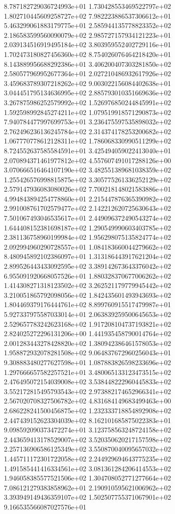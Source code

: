 8.787182729036724993e+01 1.730428553469522797e+02 1.802710445609258727e+02
7.982223886537306612e+01 5.463299061883179775e+01 2.585944135778823352e+02
2.186583599560090079e+02 2.985727157934121223e+01 2.039134516919495184e+02
3.803959552402729116e+01 1.702473180827456360e+02 8.754026076464218420e+01
8.143889956688292386e+01 3.406200407303281850e+02 2.580577969952677364e+01
2.027210486932617926e+02 3.459683789307218262e+02 9.003022156084402638e+01
3.044451795134636995e+02 2.885793010351669636e+02 3.267875986252579992e+02
1.526976850244845991e+02 1.592598992845274211e+02 1.079519918571290873e+02
7.940784477997699753e+01 3.236475597535898032e+02 2.762496236136245784e+02
2.314374178253200682e+02 1.067770778612128311e+02 1.786068330990511299e+02
8.724552637585584591e+01 3.425494059022413040e+01 2.070894371461977812e+02
4.557607491017288126e+00 3.070666516464107190e+02 3.482551389681038359e+02
1.255426576998815875e+02 3.305775261336252129e+02 2.579147936083080026e+02
7.700218148021583886e+01 4.994843894254778860e+01 2.215447876365390982e+02
2.991008761702579477e+02 2.142212620725630643e+02 7.501067493046535617e+01
2.449096372490543274e+02 1.644408152381698187e+02 1.290549990603403785e+02
2.381136758960199984e+02 1.956298075135824774e+02 2.092994960290728557e+01
1.084183660044279662e+02 8.480945892102386097e+01 1.313186443917621204e+02
2.899526443433092595e+02 3.389142673643376042e+02 6.955091920668057526e+01
1.880328370677006262e+02 1.414308271318123502e+02 3.262521179779945442e+02
3.210051865792098056e+02 1.842435601493943693e+02 1.804469379176444761e+02
8.899760915517479987e+01 5.927337975587033014e+01 2.063839259500645653e+02
2.529657783242623168e+02 1.917208104737193821e+02 2.824025272296131206e+00
1.441935458790014764e+02 2.001283443278428820e+02 1.380942386461578053e+02
1.958872932078281508e+02 9.064837672960256043e+01 9.308883480277627598e+01
1.087883826598233696e+02 1.297666657582257521e+01 3.480065133123473515e+02
2.476495072154039008e+02 3.538448222960445833e+02 3.552172815495793543e+02
2.973882174652966341e+02 2.567020708327506782e+02 4.831684149683499463e+00
2.686228241500456875e+02 1.232333718854892908e+02 2.447439152623304039e+02
8.162101685875022383e+01 9.098592090373472274e+01 3.123758563248724158e+02
2.443659413178529007e+02 3.520350620217157598e+02 2.257136906586125349e+02
3.550870040095657032e+02 1.445711172301722058e+02 2.244929694643775235e+02
1.491585441416334561e+02 3.081361284206414553e+02 1.946058385577521506e+02
1.304708052771277664e+02 7.086121279383858962e+01 2.190910595621006962e+02
3.393949149436359107e+02 1.502507755371067901e+02 9.166535566087027576e+01
